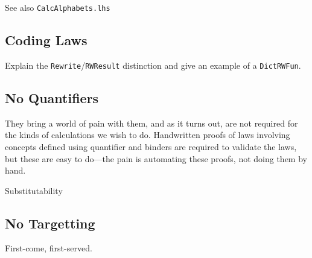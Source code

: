See also \texttt{CalcAlphabets.lhs}

\subsection{Coding Laws}\label{ssec:coding-laws}

Explain the \texttt{Rewrite}/\texttt{RWResult} distinction
and give an example of a \texttt{DictRWFun}.

\subsection{No Quantifiers}\label{ssec:no-quant}

    They bring a world of pain with them,
    and as it turns out, are not required
    for the kinds of calculations we wish to do.
    Handwritten proofs of laws involving concepts
    defined using quantifier and binders
    are required to validate the laws,
    but these are easy to do---the pain is automating these proofs,
    not doing them by hand.

    Substitutability

\subsection{No Targetting}\label{ssec:no-target}

First-come, first-served.
